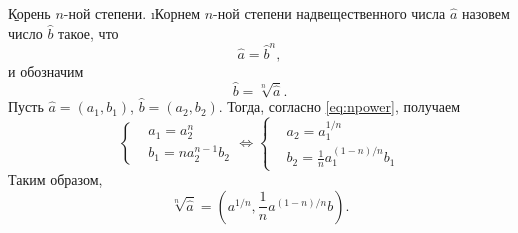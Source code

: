 \b{Корень $n$-ной степени.} \i{Корнем $n$-ной степени} надвещественного числа $\hat{a}$ назовем число $\hat{b}$ такое, что 
	$$\hat{a}=\hat{b}^n,$$
и обозначим
	$$\hat{b}=\sqrt[n]{\hat{a}}.$$
Пусть $\hat{a}=(a_1, b_1)$, $\hat{b}=(a_2, b_2)$. Тогда, согласно \eqref{eq:npower}, получаем
	$$\left\{
			\begin{aligned}
				& a_1=a_2^n \\
				& b_1=na_2^{n-1}b_2
			\end{aligned}
		\right.
		\Leftrightarrow
		\left\{
			\begin{aligned}
				& a_2=a_1^{1/n} \\
				& b_2=\frac{1}{n}a_1^{(1-n)/n}b_1
			\end{aligned}
		\right.
	$$
Таким образом,
	\begin{equation}
		\sqrt[n]{\hat{a}}=\left(a^{1/n}, \frac{1}{n}a^{(1-n)/n}b\right).
	\end{equation}

